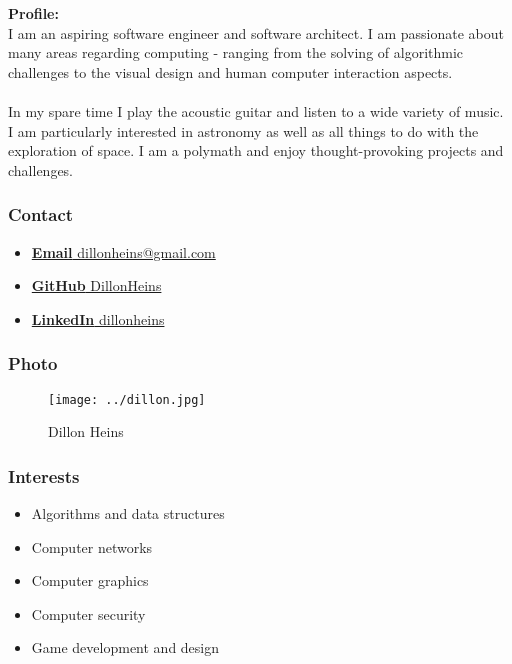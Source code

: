 \textbf{Profile:}\\
	I am an aspiring software engineer and software architect. I am passionate about many areas regarding computing - ranging from the solving of algorithmic challenges to the visual design and human computer interaction aspects.
\\\\	
	In my spare time I play the acoustic guitar and listen to a wide variety of music. I am particularly interested in astronomy as well as all things to do with the exploration of space. I am a polymath and enjoy thought-provoking projects and challenges.
	\subsubsection{Contact}
		\begin{itemize}
			\item \href{mailto:dillonheins@gmail.com}{\textbf{Email} dillonheins@gmail.com}
			\item \href{https://github.com/DillonHeins}{\textbf{GitHub} DillonHeins}
			\item \href{https://za.linkedin.com/in/dillon-heins-54275810}{\textbf{LinkedIn} dillonheins}
		\end{itemize}
	\subsubsection{Photo}
		\begin{figure}[H]
			\centering
			\texttt{[image: ../dillon.jpg]}
			\caption{Dillon Heins}
		\end{figure}
	\subsubsection{Interests}
		\begin{itemize}
			\item Algorithms and data structures
			\item Computer networks
			\item Computer graphics
			\item Computer security
			\item Game development and design
		\end{itemize}
